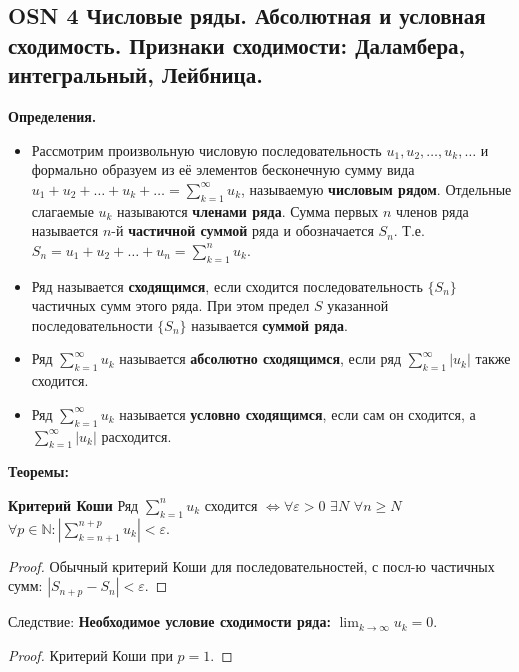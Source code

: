 \subsection{OSN 4 Числовые ряды. Абсолютная и условная сходимость. Признаки сходимости: Даламбера, интегральный, Лейбница.}

\textbf{Определения.}
\begin{itemize}
    \item Рассмотрим произвольную числовую последовательность $u_1,u_2,\dots,u_k,\dots$ и формально
    образуем из её элементов бесконечную сумму вида
    $u_1 +u_2 +\dots+u_k +\dots= \displaystyle \sum_{k=1}^{\infty}u_k$, называемую \textbf{числовым рядом}.
    Отдельные слагаемые $u_k$ называются \textbf{членами ряда}.
    Сумма первых $n$ членов ряда называется $n$-й \textbf{частичной суммой} ряда и обозначается $S_n$.
    Т.е. $S_n =u_1 +u_2 +\dots+u_n = \displaystyle \sum_{k=1}^n u_k$.
    \item Ряд называется \textbf{сходящимся}, если сходится последовательность $\{S_n\}$ частичных сумм этого ряда.
    При этом предел $S$ указанной последовательности $\{S_n\}$ называется \textbf{суммой ряда}.
    
    \item Ряд $\displaystyle \sum_{k=1}^{\infty}u_k$ называется \textbf{абсолютно сходящимся}, если ряд $\displaystyle \sum_{k=1}^{\infty}|u_k|$ также сходится.

    \item Ряд $\displaystyle \sum_{k=1}^{\infty}u_k$ называется \textbf{условно сходящимся}, если сам он сходится, а $\displaystyle \sum_{k=1}^{\infty}|u_k|$ расходится.
\end{itemize}

\textbf{Теоремы:}

\textbf{Критерий Коши} Ряд $\displaystyle \sum_{k=1}^n u_k$ сходится $\iff \forall \varepsilon > 0$ $\exists N$ $\forall n \geq N$ $ \forall p \in \mathbb{N} : \displaystyle \left|\sum_{k=n+1}^{n+p} u_k\right| < \varepsilon$.

\begin{proof}
    Обычный критерий Коши для последовательностей, с посл-ю частичных сумм: $|S_{n+p} - S_n| < \varepsilon$.
\end{proof}

Следствие: \textbf{Необходимое условие сходимости ряда:} $\lim_{k\rightarrow\infty} u_k=0$.

\begin{proof}
    Критерий Коши при $p = 1$.
\end{proof}

